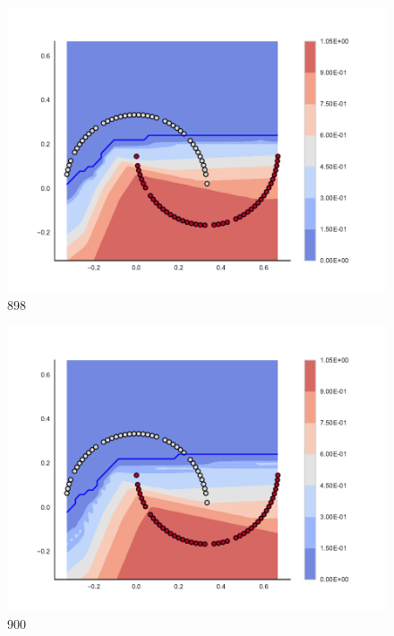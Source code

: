 \begin{subfigure}[b]{0.09\textwidth}
    \includegraphics[clip, trim=2.35cm 1.75cm 4.5cm 0cm,width=\textwidth]{img/convergence/898.pdf}
    \caption{898}
    \label{fig:convergence_898}
\end{subfigure}
%
\begin{subfigure}[b]{0.09\textwidth}
    \includegraphics[clip, trim=2.35cm 1.75cm 4.5cm 0cm,width=\textwidth]{img/convergence/900.pdf}
    \caption{900}
    \label{fig:convergence_900}
\end{subfigure}
%

